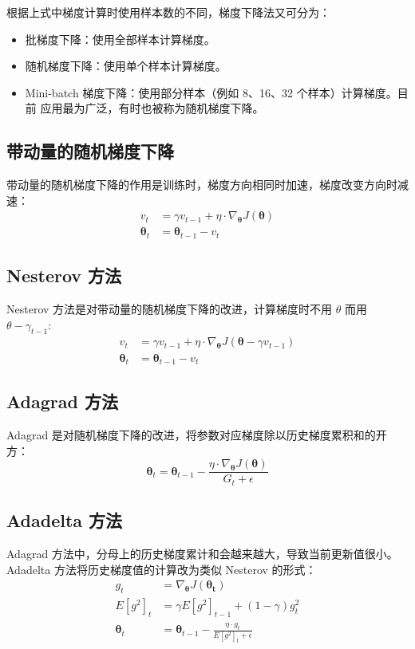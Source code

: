 根据上式中梯度计算时使用样本数的不同，梯度下降法又可分为：
\begin{itemize}
  \item 批梯度下降：使用全部样本计算梯度。
  \item 随机梯度下降：使用单个样本计算梯度。
  \item Mini-batch 梯度下降：使用部分样本（例如 8、16、32 个样本）计算梯度。目前
    应用最为广泛，有时也被称为随机梯度下降。
\end{itemize}

\subsection{带动量的随机梯度下降}
带动量的随机梯度下降的作用是训练时，梯度方向相同时加速，梯度改变方向时减速：
\begin{align}
  v_t & = \gamma v_{t-1} + \eta \cdot \nabla_{\boldsymbol{\theta}}J(\boldsymbol{\theta}) \\
  \boldsymbol{\theta}_{t} & = \boldsymbol{\theta}_{t-1} - v_t
\end{align}

\subsection{Nesterov 方法}
Nesterov 方法是对带动量的随机梯度下降的改进，计算梯度时不用 $\theta$ 而用
$\theta - \gamma_{t-1}$:
\begin{align}
  v_t & = \gamma v_{t-1} + \eta \cdot \nabla_{\boldsymbol{\theta}}J(\boldsymbol{\theta}-\gamma v_{t-1}) \\
  \boldsymbol{\theta}_{t} & = \boldsymbol{\theta}_{t-1} - v_t
\end{align}

\subsection{Adagrad 方法}
Adagrad 是对随机梯度下降的改进，将参数对应梯度除以历史梯度累积和的开方：
\begin{equation}
  \boldsymbol{\theta}_{t} = \boldsymbol{\theta}_{t-1} - \frac{\eta \cdot \nabla_{\boldsymbol{\theta}}J(\boldsymbol{\theta})}{G_t + \epsilon}
\end{equation}

\subsection{Adadelta 方法}
Adagrad 方法中，分母上的历史梯度累计和会越来越大，导致当前更新值很小。Adadelta
方法将历史梯度值的计算改为类似 Nesterov 的形式：
\begin{align}
  g_t & = \nabla_{\boldsymbol{\theta}}J(\boldsymbol{\theta_t}) \\
  E[g^2]_t & = \gamma E[g^2]_{t-1} + (1-\gamma)g_t^2 \\
  \boldsymbol{\theta}_{t} & = \boldsymbol{\theta}_{t-1} - \frac{\eta \cdot g_t}{E[g^2]_t+\epsilon}
\end{align}

